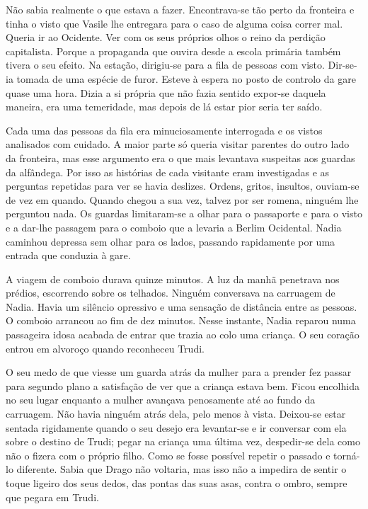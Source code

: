 Não sabia realmente o que estava a fazer. Encontrava-se tão perto da fronteira e tinha o visto que Vasile lhe entregara para
o caso de alguma coisa correr mal. Queria
ir ao Ocidente. Ver com os seus próprios olhos o reino da perdição
capitalista. Porque a propaganda que ouvira desde a escola primária
também tivera o seu efeito. Na estação, dirigiu-se para a fila de
pessoas com visto. Dir-se-ia tomada de uma espécie de furor. Esteve à espera no posto de controlo
da gare quase uma hora. Dizia a si própria que não fazia sentido
expor-se daquela maneira, era uma temeridade, mas depois de lá estar
pior seria ter saído.

Cada uma das pessoas da fila era minuciosamente interrogada e os
vistos analisados com cuidado. A maior parte só queria visitar parentes
do outro lado da fronteira, mas esse argumento era o que mais levantava
suspeitas aos guardas da alfândega. Por isso as histórias de cada
visitante eram investigadas e as perguntas repetidas para ver se havia
deslizes. Ordens, gritos, insultos, ouviam-se de vez em quando. Quando
chegou a sua vez, talvez por ser romena, ninguém lhe perguntou nada. Os
guardas limitaram-se a olhar para o passaporte e para o visto e a
dar-lhe passagem para o comboio que a levaria a Berlim Ocidental. Nadia
caminhou depressa sem olhar para os lados, passando rapidamente por uma
entrada que conduzia à gare.

A viagem de comboio durava quinze minutos. A luz da manhã penetrava nos
prédios, escorrendo sobre os telhados. Ninguém conversava na carruagem
de Nadia. Havia um silêncio opressivo e uma sensação de distância entre
as pessoas. O comboio arrancou ao fim de dez minutos. Nesse instante,
Nadia reparou numa passageira idosa acabada de entrar que trazia ao colo
uma criança. O seu coração entrou em alvoroço quando reconheceu Trudi.

O seu medo de que viesse um guarda atrás da mulher para a prender fez
passar para segundo plano a satisfação de ver que a criança estava bem.
Ficou encolhida no seu lugar enquanto a mulher avançava penosamente até
ao fundo da carruagem. Não havia ninguém atrás dela, pelo menos à vista.
Deixou-se estar sentada rigidamente quando o seu desejo era levantar-se
e ir conversar com ela sobre o destino de Trudi; pegar na criança uma
última vez, despedir-se dela como não o fizera com o próprio filho. Como
se fosse possível repetir o passado e torná-lo diferente. Sabia que
Drago não voltaria, mas isso não a impedira de sentir o toque ligeiro
dos seus dedos, das pontas das suas asas, contra o ombro, sempre que
pegara em Trudi.

